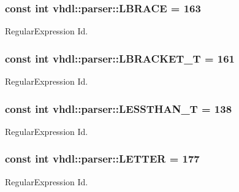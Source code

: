 \subsubsection[{L\+B\+R\+A\+C\+E}]{\setlength{\rightskip}{0pt plus 5cm}const int vhdl\+::parser\+::\+L\+B\+R\+A\+C\+E = 163}\label{namespacevhdl_1_1parser_a21d79c7e06df68dbd9b96c4869c77102}
Regular\+Expression Id. \hypertarget{namespacevhdl_1_1parser_a502ddddbef77c6f5c7f629af75b0c23f}{}
\subsubsection[{L\+B\+R\+A\+C\+K\+E\+T\+\_\+\+T}]{\setlength{\rightskip}{0pt plus 5cm}const int vhdl\+::parser\+::\+L\+B\+R\+A\+C\+K\+E\+T\+\_\+\+T = 161}\label{namespacevhdl_1_1parser_a502ddddbef77c6f5c7f629af75b0c23f}
Regular\+Expression Id. \hypertarget{namespacevhdl_1_1parser_aa5511c16355df5fcb297436b777b42ee}{}
\subsubsection[{L\+E\+S\+S\+T\+H\+A\+N\+\_\+\+T}]{\setlength{\rightskip}{0pt plus 5cm}const int vhdl\+::parser\+::\+L\+E\+S\+S\+T\+H\+A\+N\+\_\+\+T = 138}\label{namespacevhdl_1_1parser_aa5511c16355df5fcb297436b777b42ee}
Regular\+Expression Id. \hypertarget{namespacevhdl_1_1parser_a91918a12fc4752180efaa6eb140ec5b4}{}
\subsubsection[{L\+E\+T\+T\+E\+R}]{\setlength{\rightskip}{0pt plus 5cm}const int vhdl\+::parser\+::\+L\+E\+T\+T\+E\+R = 177}\label{namespacevhdl_1_1parser_a91918a12fc4752180efaa6eb140ec5b4}
Regular\+Expression Id. \hypertarget{namespacevhdl_1_1parser_aa6d8261aabc47ffdb6e4de51afb99dde}{}
